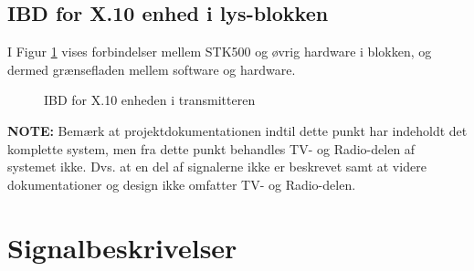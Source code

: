 \clearpage
\begin{landscape}
\subsection{IBD for X.10 enhed i lys-blokken} \label{subsec:IBDX10Lys}

I Figur \ref{fig:IDBx.10lys} vises forbindelser mellem STK500 og øvrig hardware i blokken, og dermed grænsefladen mellem software og hardware.

\begin{figure}[h]
	\centering {}
	\caption{IBD for X.10 enheden i transmitteren}
	\label{fig:IDBx.10lys}
\end{figure}
\textbf{NOTE:}
Bemærk at projektdokumentationen indtil dette punkt har indeholdt det komplette system, men fra dette punkt behandles TV- og Radio-delen af systemet ikke. Dvs. at en del af signalerne ikke er beskrevet samt at videre dokumentationer og design ikke omfatter TV- og Radio-delen.
\end{landscape}


\clearpage
\section{Signalbeskrivelser}
